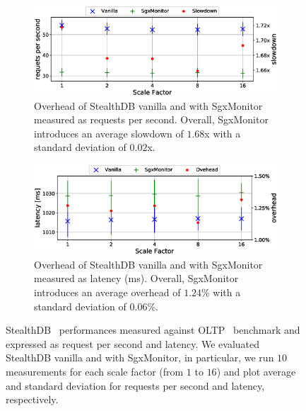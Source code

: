 \begin{figure}[t]
	\centering
	\begin{subfigure}[b]{0.49\textwidth}
		\centering
		\includegraphics[width=\textwidth]{fig_c6/request_per_second.eps}
		\caption{Overhead of \textsf{StealthDB} vanilla and with SgxMonitor 
			measured as requests per second.
			Overall, SgxMonitor introduces an average slowdown of $1.68$x with 
			a 
			standard deviation of $0.02$x.}
		\label{fig:request_per_second}
	\end{subfigure}
	\hfill
	\begin{subfigure}[b]{0.49\textwidth}
		\centering
		\includegraphics[width=\textwidth]{fig_c6/latency_2.eps}
		\caption{Overhead of \textsf{StealthDB} vanilla and with SgxMonitor 
			measured as latency (ms). 
			Overall, SgxMonitor introduces an average overhead of $1.24$\% with 
			a  
			standard deviation of $0.06$\%.}
		\label{fig:latency_2}
	\end{subfigure}
	\caption[SgxMonitor \textsf{StealthDB} 
	macro-benchmark.]{\textsf{StealthDB}~\citep{stealthdb} 
	performances measured against OLTP~\citep{oltp} benchmark and expressed as 
	request per second and latency. We evaluated \textsf{StealthDB} vanilla and 
	with SgxMonitor, in particular, we run $10$ measurements for each scale 
	factor (from $1$ to $16$) and plot average and standard deviation for 
	requests per second and latency, respectively.}
	\label{fig:request_per_second_latency}
\end{figure}

